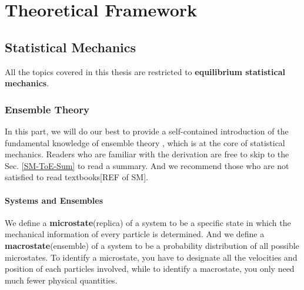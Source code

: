 \newcommand{\mat}[1]{\left(\begin{matrix}#1\end{matrix}\right)}
\newcommand{\arr}[2][n]{#2_1,#2_2,\cdots,#2_{#1}}
\newcommand{\xsim}[1]{\stackrel{#1}{\sim}}
\newcommand{\iprod}[2]{\langle#1,#2\rangle}
\newcommand{\mbb}[1]{\mathbb{#1}}
\newcommand{\mbf}[1]{\mathbf{#1}}
\newcommand{\mcal}[1]{\mathcal{#1}}
\newcommand{\mfk}[1]{\mathfrak{#1}}
\newcommand{\mrm}[1]{\mathrm{#1}}
\newcommand{\mcr}[1]{\mathscr{#1}}
\newcommand{\on}[1]{\operatorname{#1}}
\newcommand{\ol}[1]{\overline{#1}}
\newcommand{\wt}[1]{\widetilde{#1}}
\newcommand{\mr}[1]{\mathring{#1}}
\newcommand{\lr}[1]{\langle{#1}\rangle}
\newcommand{\red}[1]{\textcolor{red}{#1}}
\newcommand{\blue}[1]{\textcolor{blue}{#1}}
\newcommand{\green}[1]{\textcolor{green}{#1}}
\newcommand{\tbf}[1]{\textbf{#1}}
\newcommand{\tit}[1]{\textit{#1}}

\chapter{Theoretical Framework}

\section{Statistical Mechanics}
All the topics covered in this thesis are restricted to \textbf{equilibrium statistical mechanics}.

\subsection{Ensemble Theory}
In this part, we will do our best to provide a self-contained introduction of the fundamental knowledge of ensemble theory , which is at the core of statistical mechanics. Readers who are familiar with the derivation are free to skip to the Sec. \ref{SM-ToE-Sum} to read a summary. And we recommend those who are not satisfied to read textbooks[REF of SM].

\subsubsection{Systems and Ensembles}
We define a \textbf{microstate}(replica) of a system to be a specific state in which the mechanical information of every particle is determined. And we define a \textbf{macrostate}(ensemble) of a system to be a probability distribution of all possible microstates. To identify a microstate, you have to designate all the velocities and position of each particles involved, while to identify a macrostate, you only need much fewer physical quantities.

